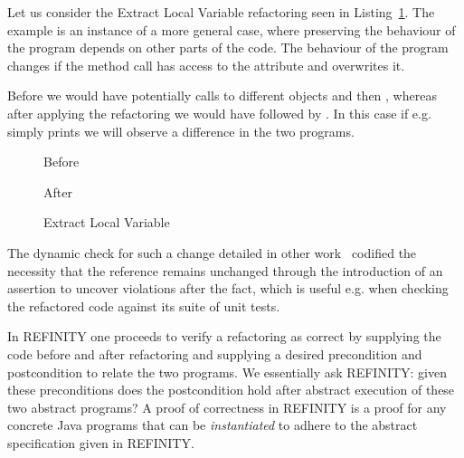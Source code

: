Let us consider the Extract Local Variable refactoring seen in Listing~\ref{lst:ExtractVariable-java}.
The example is an instance of a more general case, where preserving the behaviour of the program depends on other parts of the code.
The behaviour of the program changes if the method call  has access to the attribute  and overwrites it.

Before we would have potentially calls to different objects  and then , whereas after applying the refactoring we would
have  followed by .
In this case if e.g.  simply prints  we will observe a difference in the two programs.

\begin{figure}[tbp]
  \captionsetup{type=lstlisting}
  \centering
  \begin{sublstlisting}{.2\linewidth}
    
    \caption{Before}
  \end{sublstlisting}\hspace{1cm}
  \begin{sublstlisting}{.3\linewidth}
    
    \caption{After}
  \end{sublstlisting}
  \caption{Extract Local Variable}
  \label{lst:ExtractVariable-java}
\end{figure}

The dynamic check for such a change detailed in other work~\cite{stolz:isolarefa} codified the necessity that the reference 
remains unchanged through the introduction of an assertion  to uncover violations after the fact,
which is useful e.g. when checking the refactored code against its suite of unit tests.

In REFINITY one proceeds to verify a refactoring as correct by supplying the code before and after refactoring and supplying a desired precondition and postcondition to relate the two programs.
We essentially ask REFINITY: given these preconditions does the postcondition hold after abstract execution of these two abstract programs?
A proof of correctness in REFINITY is a proof for any concrete Java programs that can be \emph{instantiated} to adhere to the abstract specification given in REFINITY.

